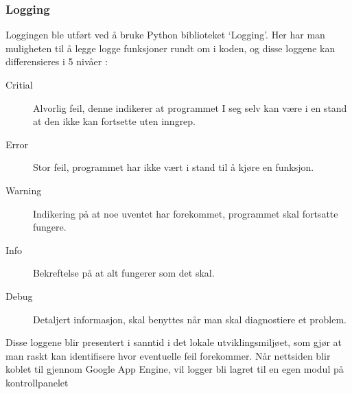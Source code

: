 \subsubsection*{Logging}
Loggingen ble utført ved å bruke Python biblioteket ‘Logging’. Her har man muligheten til å legge logge funksjoner rundt om i koden, og disse loggene kan differensieres i 5 nivåer \citep{python:logging}:

\begin{description}
\item[Critial]Alvorlig feil, denne indikerer at programmet I seg selv kan være i en stand at den ikke kan fortsette uten inngrep.
\item[Error]Stor feil, programmet har ikke vært i stand til å kjøre en  funksjon.
\item[Warning]Indikering på at noe uventet har forekommet, programmet skal fortsatte fungere.
\item[Info]Bekreftelse på at alt fungerer som det skal.
\item[Debug]Detaljert informasjon, skal benyttes når man skal diagnostiere et problem.
\end{description}

Disse loggene blir presentert i sanntid i det lokale utviklingsmiljøet, som gjør at man raskt kan identifisere hvor eventuelle feil forekommer. Når nettsiden blir koblet til gjennom Google App Engine, vil logger bli lagret til en egen modul på kontrollpanelet %


